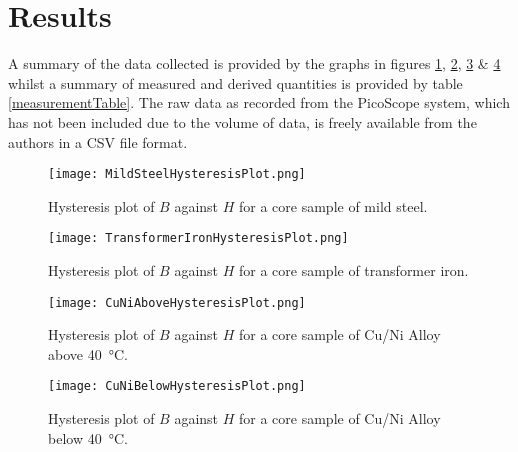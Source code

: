 \documentclass[12pt]{article}
\begin{document}
\section{Results}
A summary of the data collected is provided by the graphs in figures \ref{MildSteelHysteresisPlot}, \ref{TransformerIronHysteresisPlot}, \ref{CuNiAboveHysteresisPlot} \& \ref{CuNiBelowHysteresisPlot} whilst a summary of measured and derived quantities is provided by table \ref{measurementTable}. The raw data as recorded from the PicoScope system, which has not been included due to the volume of data, is freely available from the authors in a CSV file format.

\begin{figure}[H]
\centering
\texttt{[image: MildSteelHysteresisPlot.png]}
\caption{Hysteresis plot of $B$ against $H$ for a core sample of mild steel.}
\label{MildSteelHysteresisPlot}
\end{figure}

\begin{figure}[H]
\centering
\texttt{[image: TransformerIronHysteresisPlot.png]}
\caption{Hysteresis plot of $B$ against $H$ for a core sample of transformer iron.}
\label{TransformerIronHysteresisPlot}
\end{figure}

\begin{figure}[H]
\centering
\texttt{[image: CuNiAboveHysteresisPlot.png]}
\caption{Hysteresis plot of $B$ against $H$ for a core sample of Cu/Ni Alloy above \SI{40}{\celsius}.}
\label{CuNiAboveHysteresisPlot}
\end{figure}

\begin{figure}[H]
\centering
\texttt{[image: CuNiBelowHysteresisPlot.png]}
\caption{Hysteresis plot of $B$ against $H$ for a core sample of Cu/Ni Alloy below \SI{40}{\celsius}.}
\label{CuNiBelowHysteresisPlot}
\end{figure}
\end{document}
